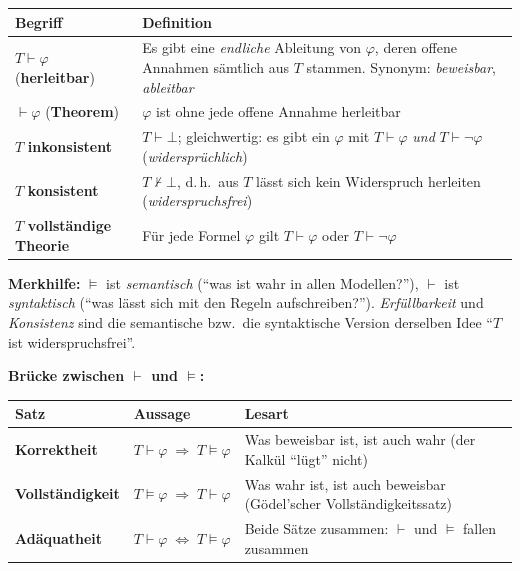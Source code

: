 \begin{center}
\renewcommand{\arraystretch}{1.5}
\begin{tabularx}{\textwidth}{l X}
\textbf{Begriff} & \textbf{Definition} \\
\hline
$T\vdash\varphi$ \quad(\textbf{herleitbar}) & Es gibt eine \emph{endliche} Ableitung von $\varphi$, deren offene Annahmen sämtlich aus $T$ stammen. Synonym: \emph{beweisbar}, \emph{ableitbar} \\
$\vdash\varphi$ \quad(\textbf{Theorem}) & $\varphi$ ist ohne jede offene Annahme herleitbar \\
$T$ \textbf{inkonsistent} & $T\vdash\bot$; gleichwertig: es gibt ein $\varphi$ mit $T\vdash\varphi$ \emph{und} $T\vdash\neg\varphi$ (\emph{widersprüchlich}) \\
$T$ \textbf{konsistent} & $T\nvdash\bot$, d.\,h.\ aus $T$ lässt sich kein Widerspruch herleiten (\emph{widerspruchsfrei}) \\
$T$ \textbf{vollständige Theorie} & Für jede Formel $\varphi$ gilt $T\vdash\varphi$ oder $T\vdash\neg\varphi$ \\
\end{tabularx}
\end{center}

\medskip
\noindent\textbf{Merkhilfe:} $\models$ ist \emph{semantisch} (\enquote{was ist wahr in allen Modellen?}), $\vdash$ ist \emph{syntaktisch} (\enquote{was lässt sich mit den Regeln aufschreiben?}). \emph{Erfüllbarkeit} und \emph{Konsistenz} sind die semantische bzw.\ die syntaktische Version derselben Idee \enquote{$T$ ist widerspruchsfrei}.

\medskip
\noindent\textbf{Brücke zwischen $\vdash$ und $\models$:}
\begin{center}
\renewcommand{\arraystretch}{1.5}
\begin{tabularx}{\textwidth}{l l X}
\textbf{Satz} & \textbf{Aussage} & \textbf{Lesart} \\
\hline
\textbf{Korrektheit} & $T\vdash\varphi \;\Rightarrow\; T\models\varphi$ & Was beweisbar ist, ist auch wahr (der Kalkül \enquote{lügt} nicht) \\
\textbf{Vollständigkeit} & $T\models\varphi \;\Rightarrow\; T\vdash\varphi$ & Was wahr ist, ist auch beweisbar (Gödel'scher Vollständigkeitssatz) \\
\textbf{Adäquatheit} & $T\vdash\varphi \;\Longleftrightarrow\; T\models\varphi$ & Beide Sätze zusammen: $\vdash$ und $\models$ fallen zusammen \\
\end{tabularx}
\end{center}

